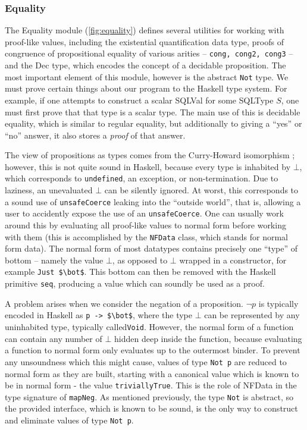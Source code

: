 \subsubsection{Equality}

The Equality module (\ref{fig:equality}) defines several 
utilities for working
with proof-like values, including the existential 
quantification data type,
proofs of congruence of propositional equality of various 
arities -- \lstinline{cong, cong2, cong3} -- and the Dec type, which 
encodes the concept of
a decidable proposition. The most important element of this 
module, however is
the abstract \lstinline{Not} type. We must prove certain 
things about our
program to the Haskell type system. For example, if one 
attempts to construct a
scalar SQLVal for some SQLType $S$, one must first prove 
that that type is a
scalar type. The main use of this is decidable equality, 
which is similar to
regular equality, but additionally to giving a ``yes'' or 
``no'' answer, it also
stores a \emph{proof} of that answer.

The view of propositions as types comes from the 
Curry-Howard
isomorphism \cite{props}; however, this is not quite sound 
in Haskell, because
every type is inhabited by $\bot$, which corresponds to 
\texttt{undefined}, an
exception, or non-termination. Due to laziness, an 
unevaluated $\bot$ can be
silently ignored. At worst, this corresponds to a sound use 
of
\lstinline{unsafeCoerce} leaking into the ``outside 
world'', that is, allowing
a user to accidently expose the use of an 
\lstinline{unsafeCoerce}. One can
usually work around this by evaluating all proof-like 
values to normal form
before working with them (this is accomplished by the 
\lstinline{NFData} class,
which stands for normal form data). The normal form of most 
datatypes contains
precisely one ``type'' of bottom -- namely the value 
$\bot$, as opposed to
$\bot$ wrapped in a constructor, for example 
\lstinline{Just $\bot$}. This
bottom can then be removed with the Haskell primitive 
\lstinline{seq},
producing a value which can soundly be used as a proof.

A problem arises when we consider the negation of a proposition. $\lnot p$ 
is typically encoded in Haskell as \lstinline{p -> $\bot$}, where the type 
$\bot$
can be represented by any uninhabited type, typically called\lstinline{Void}. 
However, the normal form of a function can contain any number of $\bot$ hidden 
deep inside the function, because evaluating a function to normal form only 
evaluates up to the outermost binder.  To prevent any
unsoundness which this might cause, values of type \lstinline{Not p} are reduced
to normal form as they are built, starting with a canonical value which is known
to be in normal form - the value \lstinline{triviallyTrue}.  This is the role of
NFData in the type signature of \lstinline{mapNeg}.  As mentioned previously,
the type \lstinline{Not} is abstract, so the provided interface, which is known
to be sound, is the only way to construct and eliminate values of type
\lstinline{Not p}.


